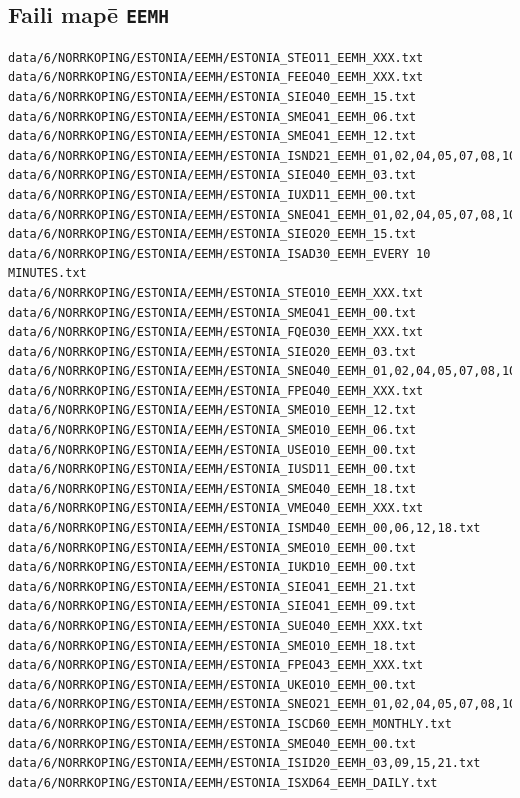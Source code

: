 \documentclass[12pt,a4paper]{article}
\begin{document}
\subsection*{Faili mapē \texttt{EEMH}}
\begin{lstlisting}[breaklines]
data/6/NORRKOPING/ESTONIA/EEMH/ESTONIA_STEO11_EEMH_XXX.txt
data/6/NORRKOPING/ESTONIA/EEMH/ESTONIA_FEEO40_EEMH_XXX.txt
data/6/NORRKOPING/ESTONIA/EEMH/ESTONIA_SIEO40_EEMH_15.txt
data/6/NORRKOPING/ESTONIA/EEMH/ESTONIA_SMEO41_EEMH_06.txt
data/6/NORRKOPING/ESTONIA/EEMH/ESTONIA_SMEO41_EEMH_12.txt
data/6/NORRKOPING/ESTONIA/EEMH/ESTONIA_ISND21_EEMH_01,02,04,05,07,08,10,11,13,14,16,17,19,20,22,23.txt
data/6/NORRKOPING/ESTONIA/EEMH/ESTONIA_SIEO40_EEMH_03.txt
data/6/NORRKOPING/ESTONIA/EEMH/ESTONIA_IUXD11_EEMH_00.txt
data/6/NORRKOPING/ESTONIA/EEMH/ESTONIA_SNEO41_EEMH_01,02,04,05,07,08,10,11,13,14,16,17,19,20,22,23.txt
data/6/NORRKOPING/ESTONIA/EEMH/ESTONIA_SIEO20_EEMH_15.txt
data/6/NORRKOPING/ESTONIA/EEMH/ESTONIA_ISAD30_EEMH_EVERY 10 MINUTES.txt
data/6/NORRKOPING/ESTONIA/EEMH/ESTONIA_STEO10_EEMH_XXX.txt
data/6/NORRKOPING/ESTONIA/EEMH/ESTONIA_SMEO41_EEMH_00.txt
data/6/NORRKOPING/ESTONIA/EEMH/ESTONIA_FQEO30_EEMH_XXX.txt
data/6/NORRKOPING/ESTONIA/EEMH/ESTONIA_SIEO20_EEMH_03.txt
data/6/NORRKOPING/ESTONIA/EEMH/ESTONIA_SNEO40_EEMH_01,02,04,05,07,08,10,11,13,14,16,17,19,20,22,23.txt
data/6/NORRKOPING/ESTONIA/EEMH/ESTONIA_FPEO40_EEMH_XXX.txt
data/6/NORRKOPING/ESTONIA/EEMH/ESTONIA_SMEO10_EEMH_12.txt
data/6/NORRKOPING/ESTONIA/EEMH/ESTONIA_SMEO10_EEMH_06.txt
data/6/NORRKOPING/ESTONIA/EEMH/ESTONIA_USEO10_EEMH_00.txt
data/6/NORRKOPING/ESTONIA/EEMH/ESTONIA_IUSD11_EEMH_00.txt
data/6/NORRKOPING/ESTONIA/EEMH/ESTONIA_SMEO40_EEMH_18.txt
data/6/NORRKOPING/ESTONIA/EEMH/ESTONIA_VMEO40_EEMH_XXX.txt
data/6/NORRKOPING/ESTONIA/EEMH/ESTONIA_ISMD40_EEMH_00,06,12,18.txt
data/6/NORRKOPING/ESTONIA/EEMH/ESTONIA_SMEO10_EEMH_00.txt
data/6/NORRKOPING/ESTONIA/EEMH/ESTONIA_IUKD10_EEMH_00.txt
data/6/NORRKOPING/ESTONIA/EEMH/ESTONIA_SIEO41_EEMH_21.txt
data/6/NORRKOPING/ESTONIA/EEMH/ESTONIA_SIEO41_EEMH_09.txt
data/6/NORRKOPING/ESTONIA/EEMH/ESTONIA_SUEO40_EEMH_XXX.txt
data/6/NORRKOPING/ESTONIA/EEMH/ESTONIA_SMEO10_EEMH_18.txt
data/6/NORRKOPING/ESTONIA/EEMH/ESTONIA_FPEO43_EEMH_XXX.txt
data/6/NORRKOPING/ESTONIA/EEMH/ESTONIA_UKEO10_EEMH_00.txt
data/6/NORRKOPING/ESTONIA/EEMH/ESTONIA_SNEO21_EEMH_01,02,04,05,07,08,10,11,13,14,16,17,19,20,22,23.txt
data/6/NORRKOPING/ESTONIA/EEMH/ESTONIA_ISCD60_EEMH_MONTHLY.txt
data/6/NORRKOPING/ESTONIA/EEMH/ESTONIA_SMEO40_EEMH_00.txt
data/6/NORRKOPING/ESTONIA/EEMH/ESTONIA_ISID20_EEMH_03,09,15,21.txt
data/6/NORRKOPING/ESTONIA/EEMH/ESTONIA_ISXD64_EEMH_DAILY.txt

\end{lstlisting}
\end{document}
